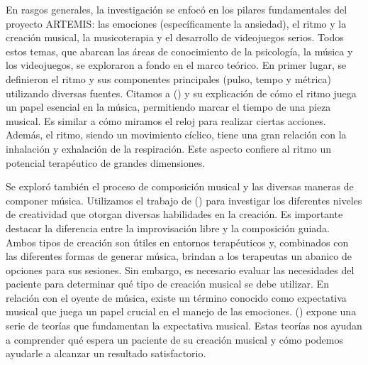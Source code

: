 En rasgos generales, la investigación se enfocó en los pilares fundamentales del proyecto ARTEMIS: las emociones (específicamente la ansiedad), el ritmo y la creación musical, la musicoterapia y el desarrollo de videojuegos serios. Todos estos temas, que abarcan las áreas de conocimiento de la psicología, la música y los videojuegos, se exploraron a fondo en el marco teórico. En primer lugar, se definieron el ritmo y sus componentes principales (pulso, tempo y métrica) utilizando diversas fuentes. Citamos a \citeauthor{CASTELLANOS:2009} (\citeyear{CASTELLANOS:2009}) y su explicación de cómo el ritmo juega un papel esencial en la música, permitiendo marcar el tiempo de una pieza musical. Es similar a cómo miramos el reloj para realizar ciertas acciones. Además, el ritmo, siendo un movimiento cíclico, tiene una gran relación con la inhalación y exhalación de la respiración. Este aspecto confiere al ritmo un potencial terapéutico de grandes dimensiones.

Se exploró también el proceso de composición musical y las diversas maneras de componer música. Utilizamos el trabajo de \citeauthor{SUBIRATS:2004} (\citeyear{SUBIRATS:2004}) para investigar los diferentes niveles de creatividad que otorgan diversas habilidades en la creación. Es importante destacar la diferencia entre la improvisación libre y la composición guiada. Ambos tipos de creación son útiles en entornos terapéuticos y, combinados con las diferentes formas de generar música, brindan a los terapeutas un abanico de opciones para sus sesiones. Sin embargo, es necesario evaluar las necesidades del paciente para determinar qué tipo de creación musical se debe utilizar. En relación con el oyente de música, existe un término conocido como expectativa musical que juega un papel crucial en el manejo de las emociones. \citeauthor{SENABRE:2019} (\citeyear{SENABRE:2019}) expone una serie de teorías que fundamentan la expectativa musical. Estas teorías nos ayudan a comprender qué espera un paciente de su creación musical y cómo podemos ayudarle a alcanzar un resultado satisfactorio.

